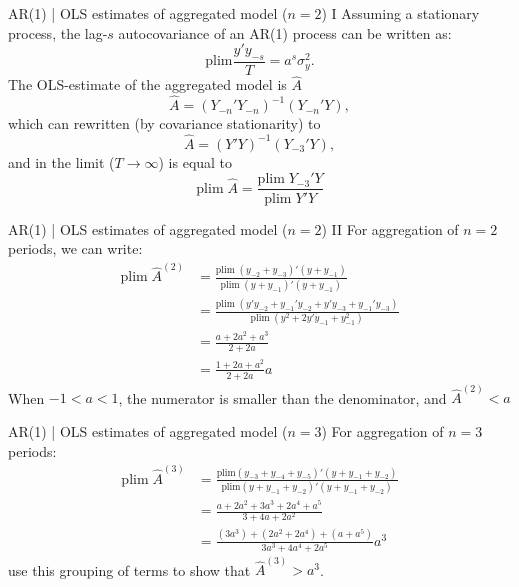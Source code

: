 \documentclass[aspectratio=169, xcolor=dvipsnames]{beamer} %
\begin{document}
\begin{frame}{AR(1) | OLS estimates of aggregated model ($n = 2$) I}
    Assuming a stationary process, the lag-$s$ autocovariance of an AR(1) process can be written as:
    \begin{equation}
        \text{plim} \frac{y'y_{-s}}{T} = a^{s} \sigma^{2}_{y}. 
    \end{equation}
    The OLS-estimate of the aggregated model is $\hat{A}$
    \begin{equation}
        \hat{A} = (Y_{-n} ' Y_{-n})^{-1}(Y_{-n} ' Y),
    \end{equation}
    which can rewritten (by covariance stationarity) to
    \begin{equation}
        \hat{A} = (Y'Y)^{-1}(Y_{-3}'Y),
    \end{equation}
    and in the limit ($T \rightarrow \infty$) is equal to
    \begin{equation} 
         \text{plim} \; \hat{A} = \frac{\text{plim} \; Y_{-3}'Y}{\text{plim} \; Y'Y}
    \end{equation}
\end{frame}


\begin{frame}{AR(1) | OLS estimates of aggregated model ($n = 2$) II}
    For aggregation of $n = 2$ periods, we can write: 
    \begin{align}
        \text{plim} \; \hat{A}^{(2)} &= \frac{\text{plim} \; (y_{-2} + y_{-3})'(y + y_{-1})}{\text{plim} \; (y + y_{-1})'(y + y_{-1})} \\
        &= \frac{\text{plim} \; (y'y_{-2} + y_{-1}'y_{-2} + y'y_{-3} + y_{-1}'y_{-3})}{\text{plim} \; (y^{2} + 2y'y_{-1} + y^{2}_{-1})}\\
        &= \frac{a + 2 a^{2} + a^{3}}{2 + 2a}\\
        &= \frac{1 + 2a + a^{2}}{2 + 2a}a
    \end{align}
    When $-1 < a < 1$, the numerator is smaller than the denominator, and $\hat{A}^{(2)} < a$
\end{frame}


\begin{frame}{AR(1) | OLS estimates of aggregated model ($n = 3$)}
    For aggregation of $n = 3$ periods: 
    \begin{align}
        \text{plim} \; \hat{A}^{(3)} &= \frac{\text{plim} (y_{-3} + y_{-4} + y_{-5})'(y + y_{-1} + y_{-2})}{\text{plim} (y + y_{-1} + y_{-2})'(y + y_{-1} + y_{-2})}\\
        &= \frac{a + 2a^{2} + 3a^{3} + 2a^{4} + a^{5}}{3 + 4a + 2a^{2}}\\
        &= \frac{(3a^{3}) + (2a^{2} + 2a^{4}) + (a + a^{5})}{3a^{3} + 4a^{4} + 2a^{5}} a^{3} \label{eq:bias_n3_AR1}
    \end{align}
    \textcite{hickman_effects_1972} use this grouping of terms to show that $\hat{A}^{(3)} > a^{3}$. 
\end{frame}
\end{document}
